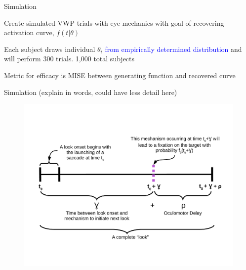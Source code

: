 \documentclass{beamer}
\newcommand{\vp}{\vspace{2mm}}
\providecommand{\cn}[1]{\textcolor{blue}{#1}}
\begin{document}
\begin{frame}{Simulation}\large

Create simulated VWP trials with eye mechanics with goal of recovering activation curve, $f(t|\theta)$ \vp \vp

Each subject draws individual $\theta_i$ \cn{from empirically determined distribution} and will perform 300 trials. 1,000 total subjects \vp \vp

Metric for efficacy is MISE between generating function and recovered curve
\end{frame}


%
%
%
%
%
%

\begin{frame}{Simulation (explain in words, could have less detail here)}

\vspace{-2.5mm}
\begin{figure}
\centering
\includegraphics[scale=0.4]{look_comp.pdf}
\end{figure}
\end{frame}
\end{document}
